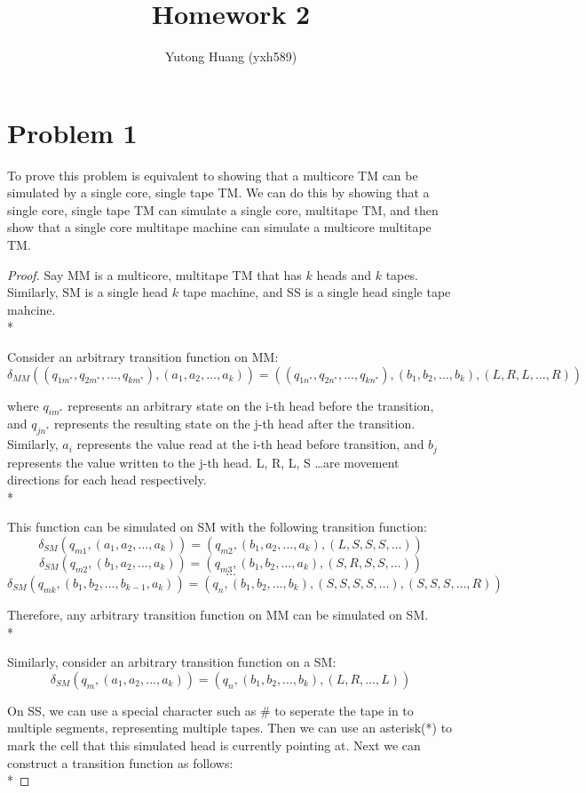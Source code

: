 \documentclass{article}
\title{\vspace{-3cm}Homework 2}
\author{Yutong Huang (yxh589)}
\date{}
\begin{document}
\maketitle
\section*{Problem 1}
To prove this problem is equivalent to showing that a multicore TM can be simulated
by a single core, single tape TM. We can do this by showing that a single core, single
tape TM can simulate a single core, multitape TM, and then show that a single core multitape
machine can simulate a multicore multitape TM.
\begin{proof}
    Say MM is a multicore, multitape TM that has $k$ heads and $k$ tapes. Similarly,
    SM is a single head $k$ tape machine, and SS is a single head single tape mahcine.\\*

    Consider an arbitrary transition function on MM:
    $$\delta_{MM}((q_{1m^*}, q_{2m^*},\dots,q_{km^*}),(a_1, a_2,\dots, a_k))=((q_{1n^*}, q_{2n^*}, \dots, q_{kn^*}), (b_1, b_2,\dots, b_k), (L, R, L, \dots, R))$$

    where $q_{im^*}$ represents an arbitrary state on the i-th head before the transition, and $q_{jn^*}$
    represents the resulting state on the j-th head after the transition. Similarly, $a_i$ represents the value read at the i-th head before transition,
    and $b_j$ represents the value written to the j-th head. L, R, L, S \dots are movement directions for
    each head respectively.\\*

    This function can be simulated on SM with the following transition function:
    $$\delta_{SM}(q_{m1}, (a_1, a_2, \dots, a_k))=(q_{m2}, (b_1, a_2,\dots, a_k), (L, S, S, S,\dots))$$
    $$\delta_{SM}(q_{m2}, (b_1, a_2, \dots, a_k))=(q_{m3}, (b_1, b_2,\dots, a_k), (S, R, S, S,\dots))$$
    $$\dots$$
    $$\delta_{SM}(q_{mk}, (b_1, b_2, \dots, b_{k-1}, a_k))=(q_{n}, (b_1, b_2,\dots, b_k), (S, S, S, S,\dots), (S, S, S,\dots, R))$$

    Therefore, any arbitrary transition function on MM can be simulated on SM.\\*

    Similarly, consider an arbitrary transition function on a SM:
    $$\delta_{SM}(q_m, (a_1, a_2, \dots, a_k))=(q_n, (b_1, b_2,\dots, b_k), (L,R, \dots, L))$$

    On SS, we can use a special character such as $\#$ to seperate the tape in to multiple
    segments, representing multiple tapes. Then we can use an asterisk(*) to mark the cell that
    this simulated head is currently pointing at. Next we can construct a transition function as follows:\\*


\end{proof}
\end{document}
